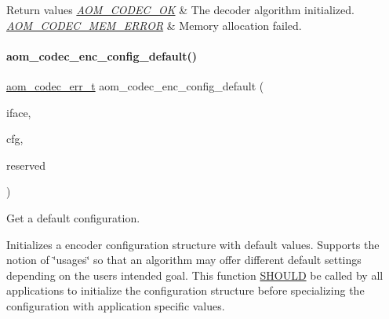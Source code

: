 \begin{DoxyRetVals}{Return values}
{\em \hyperlink{group__codec_ggaaae61e0f8663e6137f1e228757248e7caf145dc2f86014a08ebad36ac2b140001}{A\+O\+M\+\_\+\+C\+O\+D\+E\+C\+\_\+\+OK}} & The decoder algorithm initialized. \\
\hline
{\em \hyperlink{group__codec_ggaaae61e0f8663e6137f1e228757248e7caa4328d9fc527a3fd3cf76eb54e3db1a2}{A\+O\+M\+\_\+\+C\+O\+D\+E\+C\+\_\+\+M\+E\+M\+\_\+\+E\+R\+R\+OR}} & Memory allocation failed. \\
\hline
\end{DoxyRetVals}
\mbox{\label{group__encoder_gabe456ab6f99bdebc47018779b75d2521}} 
\paragraph{\texorpdfstring{aom\+\_\+codec\+\_\+enc\+\_\+config\+\_\+default()}{aom\_codec\_enc\_config\_default()}}
{\footnotesize\ttfamily \hyperlink{group__codec_gaaae61e0f8663e6137f1e228757248e7c}{aom\+\_\+codec\+\_\+err\+\_\+t} aom\+\_\+codec\+\_\+enc\+\_\+config\+\_\+default (\begin{DoxyParamCaption}\item[{\hyperlink{group__codec_ga4ef55b44c762836d1550e11921bed403}{aom\+\_\+codec\+\_\+iface\+\_\+t} $\ast$}]{iface,  }\item[{\hyperlink{group__encoder_gab9627d5dcf858b7e755a5fc4a879e451}{aom\+\_\+codec\+\_\+enc\+\_\+cfg\+\_\+t} $\ast$}]{cfg,  }\item[{unsigned int}]{reserved }\end{DoxyParamCaption})}



Get a default configuration. 

Initializes a encoder configuration structure with default values. Supports the notion of \char`\"{}usages\char`\"{} so that an algorithm may offer different default settings depending on the user\textquotesingle{}s intended goal. This function \hyperlink{rfc2119_SHOULD}{S\+H\+O\+U\+LD} be called by all applications to initialize the configuration structure before specializing the configuration with application specific values.


